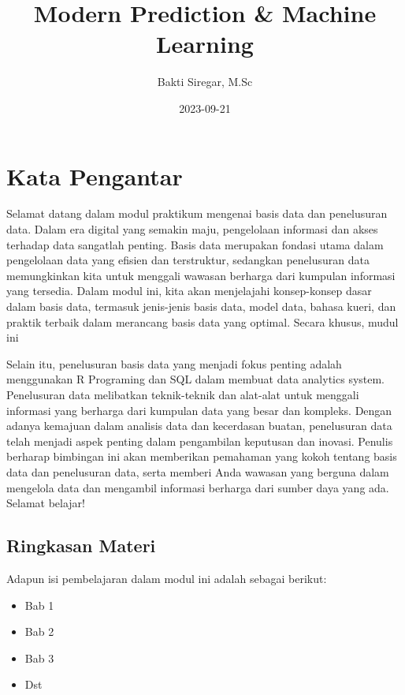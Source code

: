 \documentclass[
]{book}
\title{Modern Prediction \& Machine Learning}
\author{Bakti Siregar, M.Sc}
\date{2023-09-21}
\providecommand{\tightlist}{%
  \setlength{\itemsep}{0pt}\setlength{\parskip}{0pt}}
\begin{document}
\maketitle

{
\setcounter{tocdepth}{1}
\tableofcontents
}
\hypertarget{kata-pengantar}{%
\chapter*{Kata Pengantar}\label{kata-pengantar}}

Selamat datang dalam modul praktikum mengenai basis data dan penelusuran data. Dalam era digital yang semakin maju, pengelolaan informasi dan akses terhadap data sangatlah penting. Basis data merupakan fondasi utama dalam pengelolaan data yang efisien dan terstruktur, sedangkan penelusuran data memungkinkan kita untuk menggali wawasan berharga dari kumpulan informasi yang tersedia. Dalam modul ini, kita akan menjelajahi konsep-konsep dasar dalam basis data, termasuk jenis-jenis basis data, model data, bahasa kueri, dan praktik terbaik dalam merancang basis data yang optimal. Secara khusus, mudul ini

Selain itu, penelusuran basis data yang menjadi fokus penting adalah menggunakan R Programing dan SQL dalam membuat data analytics system. Penelusuran data melibatkan teknik-teknik dan alat-alat untuk menggali informasi yang berharga dari kumpulan data yang besar dan kompleks. Dengan adanya kemajuan dalam analisis data dan kecerdasan buatan, penelusuran data telah menjadi aspek penting dalam pengambilan keputusan dan inovasi. Penulis berharap bimbingan ini akan memberikan pemahaman yang kokoh tentang basis data dan penelusuran data, serta memberi Anda wawasan yang berguna dalam mengelola data dan mengambil informasi berharga dari sumber daya yang ada. Selamat belajar!

\hypertarget{ringkasan-materi}{%
\section*{Ringkasan Materi}\label{ringkasan-materi}}

Adapun isi pembelajaran dalam modul ini adalah sebagai berikut:

\begin{itemize}
\tightlist
\item
  Bab 1
\item
  Bab 2
\item
  Bab 3
\item
  Dst
\end{itemize}
\end{document}
